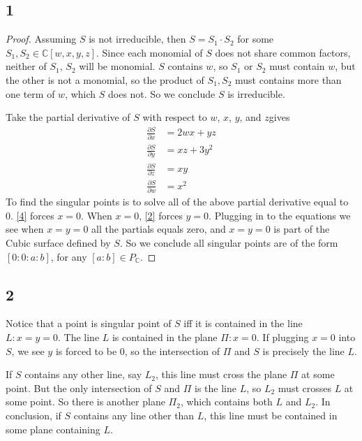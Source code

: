 \documentclass{article}
\theoremstyle{definition}
\theoremstyle{definition}
\theoremstyle{remark}
\newcommand{\bb}[1]{\mathbb{#1}} %
\begin{document}
\subsection*{1}

\begin{proof}
	Assuming $S$ is not irreducible, then $S = S_1 \cdot S_2$ for some $S_1, S_2 \in \bb{C}[w,x,y,z]$.
	Since each monomial of $S$ does not share common factors, neither of $S_1$, $S_2$ will be monomial.
	$S$ contains $w$, so $S_1$ or $S_2$ must contain $w$, but the other is not a monomial, so the product of $S_1, S_2$ must contains more than one term of $w$, which $S$ does not.
	So we conclude $S$ is irreducible.

	Take the partial derivative of $S$ with respect to $w$, $x$, $y$, and $z$gives 
	\begin{align}
		\frac{\partial S }{ \partial x} &= 2wx + yz \\	 
		\frac{\partial S }{ \partial y} &= xz + 3y^2  \label{2}\\
		\frac{\partial S }{ \partial z} &= xy \\
		\frac{\partial S }{ \partial w} &= x^2  \label{4}
	\end{align}
	To find the singular points is to solve all of the above partial derivative equal to 0.
	\eqref{4} forces $ x = 0$. 
	When $x = 0$, \eqref{2} forces $ y = 0$.
	Plugging in to the equations we see when $x = y = 0$ all the partials equals zero, and $x = y = 0$ is part of the Cubic surface defined by $S$.
	So we conclude all singular points are of the form $[0:0:a:b]$, for any $[a:b] \in P_{\bb{C}}$.
\end{proof}

\subsection*{2}

Notice that a point is singular point of $S$ iff it is contained in the line $L: x = y = 0$.
The line $L$ is contained in the plane $\Pi: x = 0$. 
If plugging $x = 0$ into $S$, we see $y$ is forced to be $0$, so the intersection of $\Pi$ and $S$ is precisely the line $L$.

If $S$ contains any other line, say $L_2$, this line must cross the plane $\Pi$ at some point. 
But the only intersection of $S$ and $\Pi$ is the line $L$, so $L_2$ must crosses $L$ at some point. 
So there is another plane $\Pi_2$, which contains both $L$ and $L_2$.
In conclusion, if $S$ contains any line other than $L$, this line must be contained in some plane containing $L$.
\end{document}
